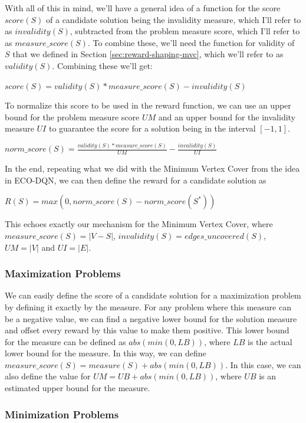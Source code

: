 \documentclass{article}
\begin{document}
With all of this in mind, we'll have a general idea of a function for the score $score(S)$ of a candidate solution being the invalidity measure, which I'll refer to as $invalidity(S)$, subtracted from the problem measure score, which I'll refer to as $measure\_score(S)$. To combine these, we'll need the function for validity of $S$ that we defined in Section \ref{sec:reward-shaping-mvc}, which we'll refer to as $validity(S)$. Combining these we'll get:

$score(S) = validity(S) * measure\_score(S) - invalidity(S)$

To normalize this score to be used in the reward function, we can use an upper bound for the problem measure score $UM$ and an upper bound for the invalidity measure $UI$ to guarantee the score for a solution being in the interval $[-1, 1]$. 

$norm\_score(S) = \frac{validity(S) * measure\_score(S)}{UM} - \frac{invalidity(S)}{UI}$

In the end, repeating what we did with the Minimum Vertex Cover from the idea in ECO-DQN, we can then define the reward for a candidate solution as 

$R(S) = max(0, norm\_score(S) - norm\_score(S^*))$

This echoes exactly our mechanism for the Minimum Vertex Cover, where $measure\_score(S) = |V - S|$, $invalidity(S) = edges\_uncovered(S)$, $UM = |V|$ and $UI = |E|$.

\subsubsection{Maximization Problems}\label{sec:generalized-max}

We can easily define the score of a candidate solution for a maximization problem by defining it exactly by the measure. For any problem where this measure can be a negative value, we can find a negative lower bound for the solution measure and offset every reward by this value to make them positive. This lower bound for the measure can be defined as $abs(min(0, LB))$, where $LB$ is the actual lower bound for the measure. In this way, we can define $measure\_score(S) = measure(S) + abs(min(0, LB))$. In this case, we can also define the value for $UM = UB + abs(min(0, LB))$, where $UB$ is an estimated upper bound for the measure.  

\subsubsection{Minimization Problems}\label{sec:generalized-min}
\end{document}
